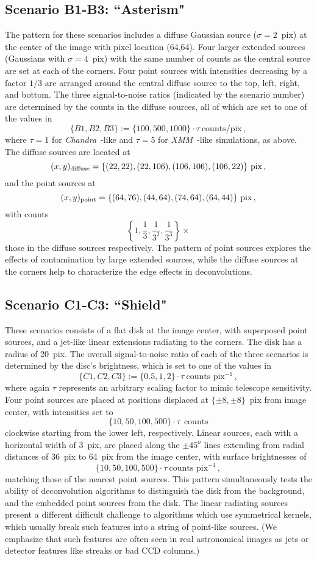 \documentclass[twocolumn, lineno]{aastex631}
\newcommand{\chandra}{\textit{Chandra}~}
\newcommand{\xmm}{\textit{XMM}~}
\begin{document}
    \subsection{Scenario B1-B3: ``Asterism"}
    The pattern for these scenarios includes a diffuse Gaussian source ($\sigma=2$~pix) at the center of the image with pixel location (64,64). Four larger extended sources (Gaussians with $\sigma=4$~pix) with the same number of counts as the central source are set at each of the corners.  Four point sources with intensities decreasing by a factor $1/3$ are arranged around the central diffuse source to the top, left, right, and bottom.  The three signal-to-noise ratios (indicated by the scenario number) are determined by the counts in the diffuse sources, all of which are set to one of the values in $$\{B1, B2, B3\} := \{100, 500, 1000\} \cdot \tau ~\textrm{counts}/\textrm{pix}\,,$$ where $\tau=1$ for \chandra-like and $\tau=5$ for \xmm-like simulations, as above.  The diffuse sources are located at
    $$(x,y)_{{\rm diffuse}} = \{(22,22), (22,106), (106,106), (106,22)\} ~\textrm{pix} \,,$$
    and the point sources at
    $$(x,y)_{{\rm point}} = \{(64,76), (44,64), (74,64), (64,44)\} ~\textrm{pix}\,,$$
    with counts
    $$\left\{1, \frac{1}{3}, \frac{1}{3^2}, \frac{1}{3^3} \right\} \times$$
    those in the diffuse sources respectively.  The pattern of point sources explores the effects of contamination by large extended sources, while the diffuse sources at the corners help to characterize the edge effects in deconvolutions.

    \subsection{Scenario C1-C3: ``Shield"}
    These scenarios consists of a flat disk at the image center, with superposed point sources, and a jet-like linear extensions radiating to the corners.  The disk has a radius of 20~pix. The overall signal-to-noise ratio of each of the three scenarios is determined by the disc's brightness, which is set to one of the values in 
    $$\{C1, C2, C3\} := \{0.5, 1, 2\} \cdot \tau ~\textrm{counts~pix}^{-1} \,,$$
    where again $\tau$ represents an arbitrary scaling factor to mimic telescope sensitivity.  Four point sources are placed at positions displaced at $\{\pm8,\pm8\}$~pix from image center, with intensities set to
    $$\{10, 50, 100, 500\} \cdot \tau ~~\textrm{counts}$$
    clockwise starting from the lower left, respectively.  Linear sources, each with a horizontal width of 3~pix, are placed along the $\pm45^o$ lines extending from radial distances of 36~pix to 64~pix from the image center, with surface brightnesses of 
    $$\{10, 50, 100, 500\} \cdot \tau ~\textrm{counts~pix}^{-1} \,,$$
    matching those of the nearest point sources.  This pattern simultaneously tests the ability of deconvolution algorithms to distinguish the disk from the background, and the embedded point sources from the disk.  The linear radiating sources present a different difficult challenge to algorithms which use symmetrical kernels, which usually break such features into a string of point-like sources. (We emphasize that such features are often seen in real astronomical images as jets or detector features like streaks or bad CCD columns.) 
\end{document}
